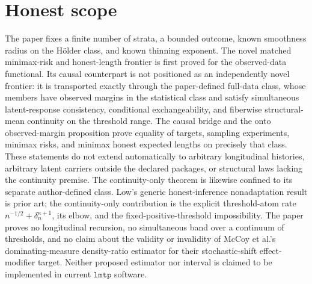 \documentclass{article}
\begin{document}
\section{Honest scope}

The paper fixes a finite number of strata, a bounded outcome, known smoothness radius on the Hölder class, and known thinning exponent. The novel matched minimax-risk and honest-length frontier is first proved for the observed-data functional. Its causal counterpart is not positioned as an independently novel frontier: it is transported exactly through the paper-defined full-data class, whose members have observed margins in the statistical class and satisfy simultaneous latent-response consistency, conditional exchangeability, and fiberwise structural-mean continuity on the threshold range. The causal bridge and the onto observed-margin proposition prove equality of targets, sampling experiments, minimax risks, and minimax honest expected lengths on precisely that class. These statements do not extend automatically to arbitrary longitudinal histories, arbitrary latent carriers outside the declared packages, or structural laws lacking the continuity premise. The continuity-only theorem is likewise confined to its separate author-defined class. Low's generic honest-inference nonadaptation result is prior art; the continuity-only contribution is the explicit threshold-atom rate \(n^{-1/2}+\delta_n^{\kappa+1}\), its elbow, and the fixed-positive-threshold impossibility. The paper proves no longitudinal recursion, no simultaneous band over a continuum of thresholds, and no claim about the validity or invalidity of McCoy et al.'s dominating-measure density-ratio estimator for their stochastic-shift effect-modifier target. Neither proposed estimator nor interval is claimed to be implemented in current \(\texttt{lmtp}\) software.
\end{document}
